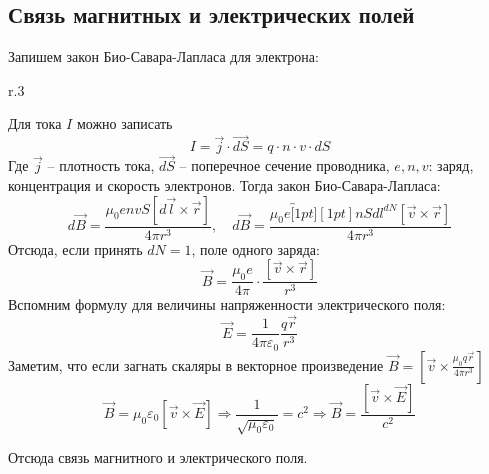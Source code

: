 \subsection{Связь магнитных и электрических полей}

Запишем закон Био-Савара-Лапласа для электрона:

\setlength\intextsep{0.5cm}
\setlength\columnsep{0.5cm}
\begin{wrapfigure}[8]{r}{.3\textwidth}
\begin{center}
\end{center}
\end{wrapfigure}
Для тока $I$ можно записать
\begin{equation*}
    I = \Vec{j} \cdot \Vec{dS} = q \cdot n \cdot v \cdot dS
\end{equation*}
Где $\Vec{j}$ -- плотность тока, $\Vec{dS}$ -- поперечное сечение проводника, $e, n, v$:  заряд, концентрация и скорость электронов. Тогда закон Био-Савара-Лапласа:
\setlength{\abovedisplayskip}{3pt}\setlength{\belowdisplayskip}{1.5pt}\begin{equation*}
    d\Vec{B} = \frac{\mu_0 e n v S [d \Vec{l} \times \Vec{r}]}{4 \pi r^3}, \quad
    d\Vec{B} = \frac{\mu_0 e \overbracket[1pt][1pt]{n S dl}^{dN} [\Vec{v} \times \Vec{r}]}{4 \pi r^3}
\end{equation*}
Отсюда, если принять $dN = 1$, поле одного заряда:
\begin{equation}
    \boxed{\Vec{B} = \frac{\mu_0 e}{4 \pi} \cdot \frac{[\Vec{v} \times \Vec{r}]}{r^3}}
    \label{eq:scmf}
\end{equation}
Вспомним формулу для величины напряженности электрического поля:
\begin{equation*}
    \Vec{E} = \frac{1}{4 \pi \varepsilon_0} \frac{q \Vec{r}}{r^3}
\end{equation*}
Заметим, что если загнать скаляры в векторное произведение $\displaystyle\Vec{B} = \left[\Vec{v} \times \frac{\mu_0 q \Vec{r}}{4 \pi r^3}\right]$
\begin{equation*}
    \Vec{B} = \mu_0 \varepsilon_0 [\Vec{v} \times \Vec{E}] \Longrightarrow \frac{1}{\sqrt{\mu_0 \varepsilon_0}} = c^2 \Longrightarrow \boxed{\Vec{B} = \frac{[\Vec{v} \times \Vec{E}]}{c^2}}
\end{equation*}
\setlength{\abovedisplayskip}{12.0pt plus 3.0pt
minus 7.0pt}
\setlength{\belowdisplayskip}{12.0pt plus 3.0pt
minus 7.0pt}

Отсюда связь магнитного и электрического поля. 